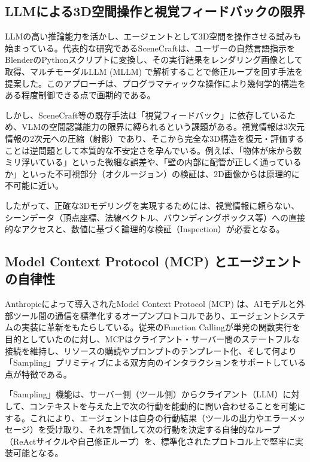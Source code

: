 \documentclass[dvipdfmx, a4paper, 9pt]{deimj}
\begin{document}
\subsection{LLMによる3D空間操作と視覚フィードバックの限界}

LLMの高い推論能力を活かし、エージェントとして3D空間を操作させる試みも始まっている。代表的な研究であるSceneCraft\cite{hu2024scenecraft}は、ユーザーの自然言語指示をBlenderのPythonスクリプトに変換し、その実行結果をレンダリング画像として取得、マルチモーダルLLM (MLLM) で解析することで修正ループを回す手法を提案した。このアプローチは、プログラマティックな操作により幾何学的構造をある程度制御できる点で画期的である。

しかし、SceneCraft等の既存手法は「視覚フィードバック」に依存しているため、VLMの空間認識能力の限界に縛られるという課題がある。視覚情報は3次元情報の2次元への圧縮（射影）であり、そこから完全な3D構造を復元・評価することは逆問題として本質的な不安定さを孕んでいる。例えば、「物体が床から数ミリ浮いている」といった微細な誤差や、「壁の内部に配管が正しく通っているか」といった不可視部分（オクルージョン）の検証は、2D画像からは原理的に不可能に近い。

したがって、正確な3Dモデリングを実現するためには、視覚情報に頼らない、シーンデータ（頂点座標、法線ベクトル、バウンディングボックス等）への直接的なアクセスと、数値に基づく論理的な検証（Inspection）が必要となる。

\subsection{Model Context Protocol (MCP) とエージェントの自律性}

Anthropicによって導入されたModel Context Protocol (MCP)\cite{anthropic2024mcp} は、AIモデルと外部ツール間の通信を標準化するオープンプロトコルであり、エージェントシステムの実装に革新をもたらしている。従来のFunction Callingが単発の関数実行を目的としていたのに対し\cite{schick2024toolformer}、MCPはクライアント・サーバー間のステートフルな接続を維持し、リソースの購読やプロンプトのテンプレート化、そして何より「Sampling」プリミティブによる双方向のインタラクションをサポートしている点が特徴である。

「Sampling」機能は、サーバー側（ツール側）からクライアント（LLM）に対して、コンテキストを与えた上で次の行動を能動的に問い合わせることを可能にする。これにより、エージェントは自身の行動結果（ツールの出力やエラーメッセージ）を受け取り、それを評価して次の行動を決定する自律的なループ（ReActサイクル\cite{yao2023react}や自己修正ループ\cite{shinn2024reflexion,xi2023rise}）を、標準化されたプロトコル上で堅牢に実装可能となる。
\end{document}
